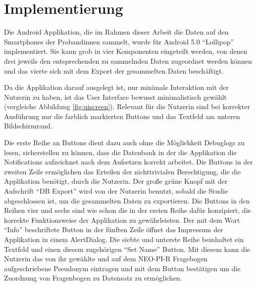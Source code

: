 
\chapter{Implementierung}
\label{ch:Implementierung}
Die Android Applikation, die im Rahmen dieser Arbeit die Daten auf den Smartphones der Probandinnen sammelt, wurde für Android 5.0 "`Lollipop"' implementiert.
Sie kann grob in vier Komponenten eingeteilt werden, von denen drei jeweils den entsprechenden zu sammelnden Daten zugeordnet werden können und das vierte sich mit dem Export der gesammelten Daten beschäftigt.

Da die Applikation darauf ausgelegt ist, nur minimale Interaktion mit der Nutzerin zu haben,
ist das User Interface bewusst minimalistisch gewählt (vergleiche Abbildung \ref{fig:uiscreen}).
Relevant für die Nutzerin sind bei korrekter Ausführung nur die farblich markierten Buttons und das Textfeld am unteren Bildschirmrand.


Die erste Reihe an Buttons dient dazu auch ohne die Möglichkeit Debuglogs zu lesen, sicherstellen zu können, dass die Datenbank in der die Applikation die Notifications aufzeichnet nach dem Aufsetzen korrekt arbeitet.
Die Buttons in der zweiten Zeile ermöglichen das Erteilen der nichttrivialen Berechtigung, die die Applikation benötigt, durch die Nutzerin.
Der große grüne Knopf mit der Aufschrift "`DB Export"' wird von der Nutzerin benutzt, sobald die Studie abgeschlossen ist, um die gesammelten Daten zu exportieren.
Die Buttons in den Reihen vier und sechs sind wie schon die in der ersten Reihe dafür konzipiert, die korrekte Funktionsweise der Applikation zu gewährleisten.
Der mit dem Wort "`Info"' beschriftete Button in der fünften Zeile öffnet das Impressum der Applikation in einem AlertDialog.
Die siebte und unterste Reihe beinhaltet ein Textfeld und einen diesem zugehörigen "`Set Name"' Button.
Mit diesem kann die Nutzerin das von ihr gewählte und auf dem NEO-PI-R Fragebogen aufgeschriebene Pseudonym eintragen und mit dem Button bestätigen um die Zuordnung von Fragenbogen zu Datensatz zu ermöglichen.

